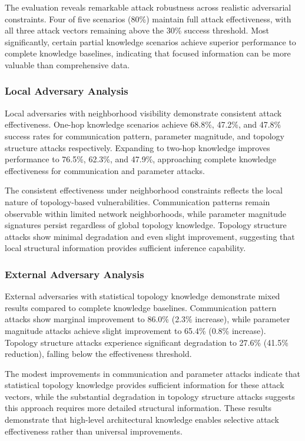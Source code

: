 The evaluation reveals remarkable attack robustness across realistic adversarial constraints. Four of five scenarios (80\%) maintain full attack effectiveness, with all three attack vectors remaining above the 30\% success threshold. Most significantly, certain partial knowledge scenarios achieve superior performance to complete knowledge baselines, indicating that focused information can be more valuable than comprehensive data.

\subsubsection{Local Adversary Analysis}

Local adversaries with neighborhood visibility demonstrate consistent attack effectiveness. One-hop knowledge scenarios achieve 68.8\%, 47.2\%, and 47.8\% success rates for communication pattern, parameter magnitude, and topology structure attacks respectively. Expanding to two-hop knowledge improves performance to 76.5\%, 62.3\%, and 47.9\%, approaching complete knowledge effectiveness for communication and parameter attacks.

The consistent effectiveness under neighborhood constraints reflects the local nature of topology-based vulnerabilities. Communication patterns remain observable within limited network neighborhoods, while parameter magnitude signatures persist regardless of global topology knowledge. Topology structure attacks show minimal degradation and even slight improvement, suggesting that local structural information provides sufficient inference capability.

\subsubsection{External Adversary Analysis}

External adversaries with statistical topology knowledge demonstrate mixed results compared to complete knowledge baselines. Communication pattern attacks show marginal improvement to 86.0\% (2.3\% increase), while parameter magnitude attacks achieve slight improvement to 65.4\% (0.8\% increase). Topology structure attacks experience significant degradation to 27.6\% (41.5\% reduction), falling below the effectiveness threshold.

The modest improvements in communication and parameter attacks indicate that statistical topology knowledge provides sufficient information for these attack vectors, while the substantial degradation in topology structure attacks suggests this approach requires more detailed structural information. These results demonstrate that high-level architectural knowledge enables selective attack effectiveness rather than universal improvements.

